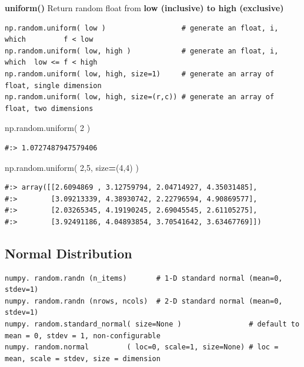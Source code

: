\documentclass[
]{book}
\newenvironment{Shaded}{\begin{snugshade}}{\end{snugshade}}
\newcommand{\DecValTok}[1]{\textcolor[rgb]{0.06,0.06,0.06}{#1}}
\newcommand{\NormalTok}[1]{#1}
\newcommand{\OperatorTok}[1]{\textcolor[rgb]{0.43,0.43,0.43}{\textbf{#1}}}
\begin{document}
\textbf{uniform()} Return random float from \textbf{low (inclusive) to high (exclusive)}

\begin{verbatim}
np.random.uniform( low )                  # generate an float, i, which         f < low
np.random.uniform( low, high )            # generate an float, i, which  low <= f < high
np.random.uniform( low, high, size=1)     # generate an array of float, single dimension
np.random.uniform( low, high, size=(r,c)) # generate an array of float, two dimensions 
\end{verbatim}

\begin{Shaded}
\begin{Highlighting}[]
\NormalTok{np.random.uniform( }\DecValTok{2}\NormalTok{ )}
\end{Highlighting}
\end{Shaded}

\begin{verbatim}
#:> 1.0727487947579406
\end{verbatim}

\begin{Shaded}
\begin{Highlighting}[]
\NormalTok{np.random.uniform( }\DecValTok{2}\NormalTok{,}\DecValTok{5}\NormalTok{, size}\OperatorTok{=}\NormalTok{(}\DecValTok{4}\NormalTok{,}\DecValTok{4}\NormalTok{) )}
\end{Highlighting}
\end{Shaded}

\begin{verbatim}
#:> array([[2.6094869 , 3.12759794, 2.04714927, 4.35031485],
#:>        [3.09213339, 4.38930742, 2.22796594, 4.90869577],
#:>        [2.03265345, 4.19190245, 2.69045545, 2.61105275],
#:>        [3.92491186, 4.04893854, 3.70541642, 3.63467769]])
\end{verbatim}

\hypertarget{normal-distribution}{%
\subsection{Normal Distribution}\label{normal-distribution}}

\begin{verbatim}
numpy. random.randn (n_items)       # 1-D standard normal (mean=0, stdev=1)
numpy. random.randn (nrows, ncols)  # 2-D standard normal (mean=0, stdev=1)
numpy. random.standard_normal( size=None )                # default to mean = 0, stdev = 1, non-configurable
numpy. random.normal         ( loc=0, scale=1, size=None) # loc = mean, scale = stdev, size = dimension
\end{verbatim}
\end{document}
